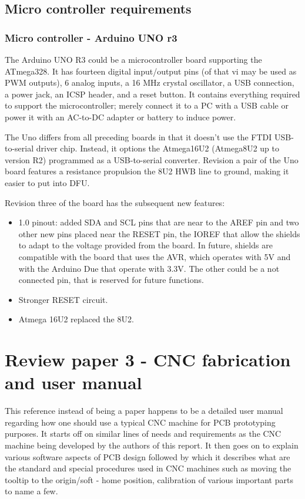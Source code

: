 \subsection{Micro controller requirements}

\subsubsection*{Micro controller - Arduino UNO r3}
The Arduino UNO R3 could be a microcontroller board supporting the ATmega328. It has fourteen digital input/output pins (of that vi may be used as PWM outputs), 6 analog inputs, a 16 MHz crystal oscillator, a USB connection, a power jack, an ICSP header, and a reset button. It contains everything required to support the microcontroller; merely connect it to a PC with a USB cable or power it with an AC-to-DC adapter or battery to induce power. \par

The Uno differs from all preceding boards in that it doesn't use the FTDI USB-to-serial driver chip. Instead, it options the Atmega16U2 (Atmega8U2 up to version R2) programmed as a USB-to-serial converter.
Revision a pair of the Uno board features a resistance propulsion the 8U2 HWB line to ground, making it easier to put into DFU.

Revision three of the board has the subsequent new features:

\begin{itemize}
 \item 1.0 pinout: added SDA and SCL pins that are near to the AREF pin and two other new pins placed near the RESET pin, the IOREF that allow the shields to adapt to the voltage provided from the board. In future, shields are compatible with the board that uses the AVR, which operates with 5V and with the Arduino Due that operate with 3.3V. The other could be a not connected pin, that is reserved for future functions.
 \item Stronger RESET circuit.
 \item Atmega 16U2 replaced the 8U2.
\end{itemize}


\section{Review paper 3 - CNC fabrication and user manual} \label{Sec:3} 

This reference \cite{iiit_pap} instead of being a paper happens to be a detailed user manual regarding how one should use a typical CNC machine for PCB prototyping purposes. It starts off on similar lines of needs and requirements as the CNC machine being developed by the authors of this report. It then goes on to explain various software aspects of PCB design followed by which it describes what are the standard and special procedures used in CNC machines such as moving the tooltip to the origin/soft - home position, calibration of various important parts to name a few. \par

